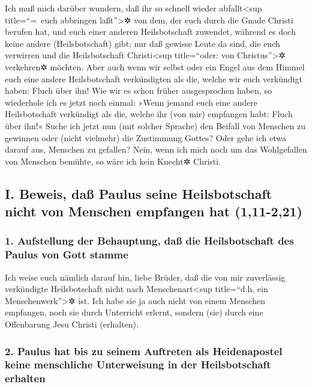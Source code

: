  Ich muß mich darüber wundern, daß ihr so schnell wieder
abfallt\textless sup title=``=~euch abbringen laßt''\textgreater✲ von
dem, der euch durch die Gnade Christi berufen hat, und euch einer
anderen Heilsbotschaft zuwendet,  während es doch keine
andere (Heilsbotschaft) gibt; nur daß gewisse Leute da sind, die euch
verwirren und die Heilsbotschaft Christi\textless sup title=``oder: von
Christus''\textgreater✲ verkehren✲ möchten.  Aber auch
wenn wir selbst oder ein Engel aus dem Himmel euch eine andere
Heilsbotschaft verkündigten als die, welche wir euch verkündigt haben:
Fluch über ihn!  Wie wir es schon früher ausgesprochen
haben, so wiederhole ich es jetzt noch einmal: »Wenn jemand euch eine
andere Heilsbotschaft verkündigt als die, welche ihr (von mir) empfangen
habt: Fluch über ihn!«  Suche ich jetzt nun (mit solcher
Sprache) den Beifall von Menschen zu gewinnen oder (nicht vielmehr) die
Zustimmung Gottes? Oder gehe ich etwa darauf aus, Menschen zu gefallen?
Nein, wenn ich mich noch um das Wohlgefallen von Menschen bemühte, so
wäre ich kein Knecht✲ Christi.

\hypertarget{i.-beweis-dauxdf-paulus-seine-heilsbotschaft-nicht-von-menschen-empfangen-hat-111-221}{%
\subsection{I. Beweis, daß Paulus seine Heilsbotschaft nicht von
Menschen empfangen hat
(1,11-2,21)}\label{i.-beweis-dauxdf-paulus-seine-heilsbotschaft-nicht-von-menschen-empfangen-hat-111-221}}

\hypertarget{aufstellung-der-behauptung-dauxdf-die-heilsbotschaft-des-paulus-von-gott-stamme}{%
\subsubsection{1. Aufstellung der Behauptung, daß die Heilsbotschaft des
Paulus von Gott
stamme}\label{aufstellung-der-behauptung-dauxdf-die-heilsbotschaft-des-paulus-von-gott-stamme}}

 Ich weise euch nämlich darauf hin, liebe Brüder, daß die
von mir zuverlässig verkündigte Heilsbotschaft nicht nach
Menschenart\textless sup title=``d.h. ein Menschenwerk''\textgreater✲
ist.  Ich habe sie ja auch nicht von einem Menschen
empfangen, noch sie durch Unterricht erlernt, sondern (sie) durch eine
Offenbarung Jesu Christi (erhalten).

\hypertarget{paulus-hat-bis-zu-seinem-auftreten-als-heidenapostel-keine-menschliche-unterweisung-in-der-heilsbotschaft-erhalten}{%
\subsubsection{2. Paulus hat bis zu seinem Auftreten als Heidenapostel
keine menschliche Unterweisung in der Heilsbotschaft
erhalten}\label{paulus-hat-bis-zu-seinem-auftreten-als-heidenapostel-keine-menschliche-unterweisung-in-der-heilsbotschaft-erhalten}}

